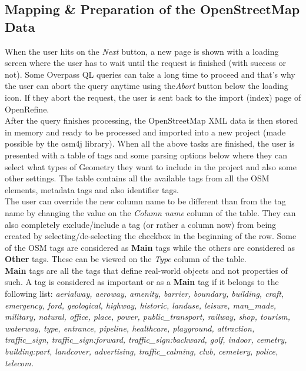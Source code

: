 \subsection{Mapping \& Preparation of the OpenStreetMap Data}\label{sec:mapping-preparation-of-openstreetmap-data}
When the user hits on the \textit{Next} button, a new page is shown with a loading screen where the user has to wait until
the request is finished (with success or not). Some Overpass QL queries can take a long time to proceed and that's why
the user can abort the query anytime using the\textit{Abort} button below the loading icon. If they abort the request,
the user is sent back to the import (index) page of OpenRefine.\\
\newline
After the query finishes processing, the OpenStreetMap XML data is then stored in memory and ready to be processed and
imported into a new project (made possible by the osm4j library).
\newline
When all the above tasks are finished, the user is presented with a table of tags and some parsing options below where they
can select what types of Geometry they want to include in the project and also some other settings. The table contains
all the available tags from all the OSM elements, metadata tags and also identifier tags. \\
\newline
The user can override the new column name to be different than from the tag name by changing the value on the
\textit{Column name} column of the table. They can also completely exclude/include a tag (or rather a column now) from being created
by selecting/de-selecting the checkbox in the beginning of the row. Some of the OSM tags are considered as \textbf{Main}
tags while the others are considered as \textbf{Other} tags. These can be viewed on the \textit{Type} column of the table.\\
\newline
\textbf{Main} tags are all the tags that define real-world objects and not properties of such.
A tag is considered as important or as a \textbf{Main} tag if it belongs to the following list:
\textit{aerialway, aeroway, amenity, barrier, boundary, building, craft, emergency, ford, geological, highway, historic,
landuse, leisure, man\_made, military, natural,
office, place, power, public\_transport, railway, shop, tourism, waterway, type, entrance, pipeline, healthcare,
playground, attraction, traffic\_sign, traffic\_sign:forward, traffic\_sign:backward, golf, indoor, cemetry, building:part,
landcover, advertising, traffic\_calming, club, cemetery, police, telecom.}\\
